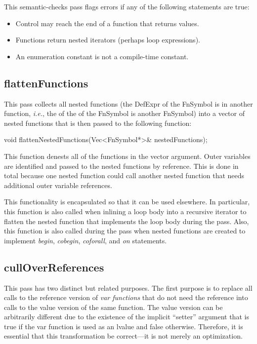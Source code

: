 \documentclass[10pt]{article}
\newcommand{\ie}{\emph{i.e.}}
\begin{document}
This semantic-checks pass flags errors if any of the following
statements are true:
\begin{itemize}
\item Control may reach the end of a function that returns values.
\item Functions return nested iterators (perhaps loop expressions).
\item An enumeration constant is not a compile-time constant.
\end{itemize}

\subsection{flattenFunctions}
\label{sec:flattenFunctions}

This pass collects all nested functions (the DefExpr of the FnSymbol
is in another function, \ie, the  of the
 of the FnSymbol is another FnSymbol) into a vector of
nested functions that is then passed to the following function:

\begin{clang}
void flattenNestedFunctions(Vec<FnSymbol*>& nestedFunctions);
\end{clang}

This function denests all of the functions in the vector argument.
Outer variables are identified and passed to the nested functions by
reference.  This is done in total because one nested function could
call another nested function that needs additional outer variable
references.

This functionality is encapsulated so that it can be used elsewhere.
In particular, this function is also called when inlining a loop body
into a recursive iterator to flatten the nested function that
implements the loop body during the  pass.  Also,
this function is also called during the  pass when nested
functions are created to implement \emph{begin}, \emph{cobegin},
\emph{coforall}, and \emph{on} statements.

\subsection{cullOverReferences}

This pass has two distinct but related purposes.  The first purpose is
to replace all calls to the reference version of \emph{var functions}
that do not need the reference into calls to the value version of the
same function.  The value version can be arbitrarily different due to
the existence of the implicit ``setter'' argument that is true if the
var function is used as an lvalue and false otherwise.  Therefore, it
is essential that this transformation be correct---it is not merely an
optimization.
\end{document}
